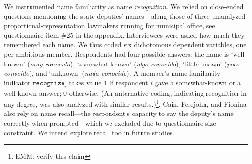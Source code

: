 \documentclass[letter,12pt]{article}
\newcommand{\mc}{\multicolumn}
\begin{document}

We instrumented name familiarity as name \emph{recognition}. We relied on close-ended questions mentioning the state deputies' names---along those of three unanalyzed proportional-representation lawmakers running for municipal office, see questionnaire item \#25 in the appendix. Interviewees were asked how much they remembered each name. We thus coded six dichotomous dependent variables, one per ambitious member. Respondents had four possible answers: the name is `well-known' (\emph{muy conocido}), `somewhat known' (\emph{algo conocido}), `little known' (\emph{poco conocido}), and `unknown' (\emph{nada conocido}). A member's name familiarity indicator $\texttt{recognize}_i$ takes value 1 if respondent $i$ gave a somewhat-known or a well-known answer; 0 otherwise. (An anternative coding, indicating recognition in any degree, was also analyzed with similar results.)\footnote{EMM: verify this claim}. Cain, Ferejohn, and Fionina also rely on name recall---the respondent's capacity to say the deputy's name correctly when prompted---which we excluded due to questionnaire size constraint. We intend explore recall too in future studies.
\end{document}
